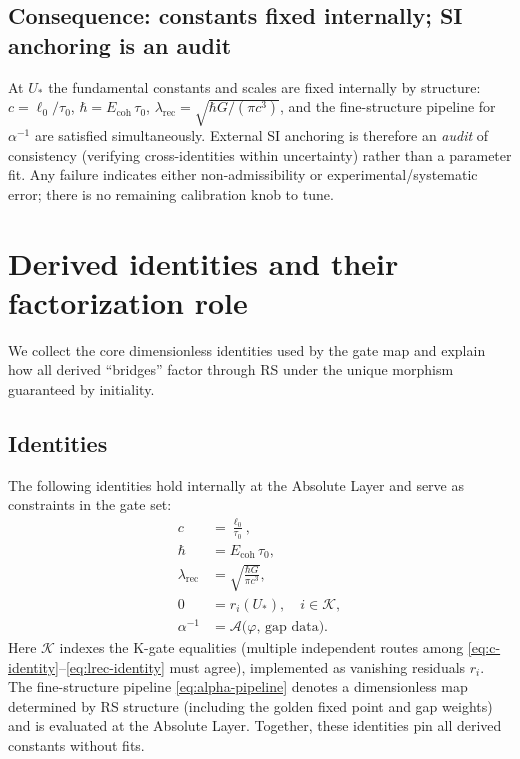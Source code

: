 \documentclass[11pt]{article}
\begin{document}
\subsection{Consequence: constants fixed internally; SI anchoring is an audit}
At \(U_*\) the fundamental constants and scales are fixed internally by structure: \(c=\ell_0/\tau_0\), \(\hbar=E_{\mathrm{coh}}\,\tau_0\), \(\lambda_{\mathrm{rec}}=\sqrt{\hbar G/(\pi c^3)}\), and the fine\mbox{-}structure pipeline for \(\alpha^{-1}\) are satisfied simultaneously. External SI anchoring is therefore an \emph{audit} of consistency (verifying cross\mbox{-}identities within uncertainty) rather than a parameter fit. Any failure indicates either non\mbox{-}admissibility or experimental/systematic error; there is no remaining calibration knob to tune.

\section{Derived identities and their factorization role}
We collect the core dimensionless identities used by the gate map and explain how all derived ``bridges'' factor through RS under the unique morphism guaranteed by initiality.

\subsection{Identities}
The following identities hold internally at the Absolute Layer and serve as constraints in the gate set:
\begin{align}
  c &= \frac{\ell_0}{\tau_0}, \label{eq:c-identity} \\
  \hbar &= E_{\mathrm{coh}}\,\tau_0, \label{eq:hbar-identity} \\
  \lambda_{\mathrm{rec}} &= \sqrt{\frac{\hbar G}{\pi c^3}}, \label{eq:lrec-identity} \\
  0 &= r_i(U_*), \quad i\in\mathcal{K}, \label{eq:kgates-zero} \\
  \alpha^{-1} &= \mathcal{A}\bigl(\varphi,\,\text{gap data}\bigr). \label{eq:alpha-pipeline}
\end{align}
Here \(\mathcal{K}\) indexes the K\mbox{-}gate equalities (multiple independent routes among \eqref{eq:c-identity}--\eqref{eq:lrec-identity} must agree), implemented as vanishing residuals \(r_i\). The fine\mbox{-}structure pipeline \eqref{eq:alpha-pipeline} denotes a dimensionless map determined by RS structure (including the golden fixed point and gap weights) and is evaluated at the Absolute Layer. Together, these identities pin all derived constants without fits.
\end{document}
